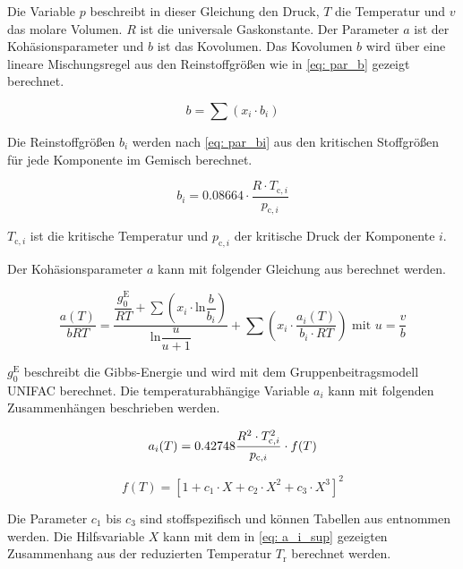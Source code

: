 \documentclass[../thesis.tex]{subfiles}
\begin{document}
Die Variable $ p $ beschreibt in dieser Gleichung den Druck, $ T $ die Temperatur und $ v $ das molare Volumen. $ R $ ist die universale Gaskonstante. Der Parameter $a$ ist der Kohäsionsparameter und $ b $ ist das Kovolumen. Das Kovolumen $ b $ wird über eine lineare Mischungsregel aus den Reinstoffgrößen wie in \autoref{eq: par_b} gezeigt berechnet.

\begin{equation}
	b = \sum \left( x_i \cdot b_i \right)
	\label{eq: par_b}
\end{equation}

Die Reinstoffgrößen $ b_i $ werden nach \autoref{eq: par_bi} aus den kritischen Stoffgrößen für jede Komponente im Gemisch berechnet.

\begin{equation}
	b_i = 0\text{.}08664 \cdot \dfrac{R \cdot T_{\mathrm{c},i}}{p_{\mathrm{c},i}}
	\label{eq: par_bi}
\end{equation}

$ T_{\mathrm{c},i} $ ist die kritische Temperatur und $ p_{\mathrm{c},i} $ der kritische Druck der Komponente $ i$.

Der Kohäsionsparameter $a$ kann mit folgender Gleichung aus \cite{horstmann2005psrk} berechnet werden.

\begin{equation}
	\dfrac{a(T)}{bRT} =	\dfrac{\dfrac{g^{\mathrm{E}}_0}{RT} +  \sum \left( x_i \cdot \mathrm{ln}\dfrac{b}{b_i} \right)}{\mathrm{ln}\dfrac{u}{u + 1}}
	+ \sum \left( x_i \cdot \dfrac{a_i(T)}{b_i \cdot RT} \right) \text{ mit } u = \dfrac{v}{b}
\end{equation}

$ g^{\mathrm{E}}_0 $ beschreibt die Gibbs-Energie und wird mit dem Gruppenbeitragsmodell UNIFAC \cite{magnussen1981unifac} berechnet. Die temperaturabhängige Variable $a_i$ kann mit folgenden Zusammenhängen beschrieben werden.

\begin{equation}
	a_i(T) = 0\text{.}42748 \dfrac{R^2 \cdot T_{\mathrm{c},i}^2}{p_{\mathrm{c},i}} \cdot f(T) \\
\end{equation}

\begin{equation}
	f(T) = \left[1 + c_1 \cdot X + c_2 \cdot X^2 + c_3 \cdot X^3 \right]^2
\end{equation} 

Die Parameter $ c_1 $ bis $ c_3 $ sind stoffspezifisch und können Tabellen aus \cite{horstmann2005psrk} entnommen werden. Die Hilfsvariable $ X$ kann mit dem in \autoref{eq: a_i_sup} gezeigten Zusammenhang aus der reduzierten Temperatur $T_\mathrm{r}$ berechnet werden.
\end{document}
